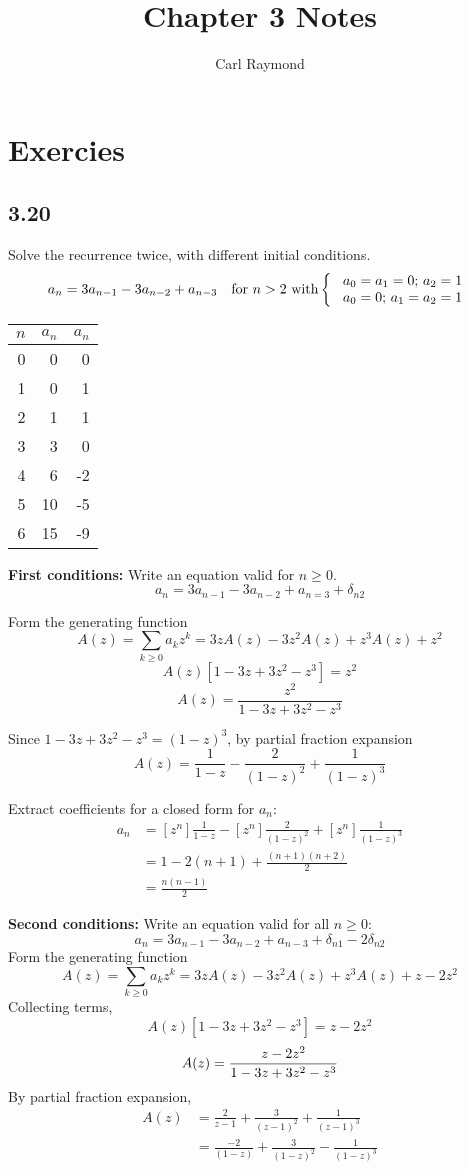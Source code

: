 \documentclass[11pt, oneside]{article}   	%
\title{Chapter 3 Notes}
\author{Carl Raymond}
\begin{document}
\maketitle
\section{Exercies}
\subsection{3.20}

Solve the recurrence twice, with different initial conditions.
\[
	a_n = 3a_{n-1} - 3a_{n-2} + a_{n-3} \quad \text{for $n>2$ with}  \left\{
	\begin{array}{l l}
		\textrm{ $a_0=a_1=0$; $a_2=1$} \\
		\textrm{ $a_0=0$; $a_1 = a_2 = 1$}
	\end{array} \right.
\]

\begin{tabular}{r | r | r}
$n$		& $a_n$	& $a_n$ \\
\hline 
0		& 0		& 0 \\
1		& 0		& 1 \\
2		& 1		& 1 \\
3		& 3		& 0 \\
4		& 6		& -2 \\
5		& 10		& -5 \\
6		& 15		& -9
\end{tabular}

\textbf{First conditions:}
Write an equation valid for $n \ge 0$.
\[
	a_n = 3a_{n-1} - 3a_{n-2} + a_{n=3} + \delta_{n2}
\]

Form the generating function
\[
	A(z) = \sum_{k \ge 0} a_k z^k = 3zA(z) - 3z^2A(z) + z^3A(z) + z^2
\]
\[
	A(z) \left[ 1 -3z + 3z^2 -z^3 \right] = z^2
\]
\[
	A(z) = \frac{z^2}{1-3z+3z^2-z^3}
\]

Since $1-3z+3z^2-z^3 = (1-z)^3$, by partial fraction expansion
\[
	A(z) = \frac{1}{1-z} - \frac{2}{(1-z)^2}  + \frac{1}{(1-z)^3}
\]

Extract coefficients for a closed form for $a_n$:
\begin{align*}
	a_n &= \left[z^n\right] \frac{1}{1-z} - \left[z^n\right] \frac{2}{(1-z)^2} + \left[z^n\right] \frac{1}{(1-z)^3} \\
		&= 1 - 2(n+1) + \frac{(n+1)(n+2)}{2} \\
		&= \frac{n(n-1)}{2}
\end{align*}

\textbf{Second conditions:} Write an equation valid for all $n \ge 0$:
\[
	a_n = 3a_{n-1} - 3a_{n-2} + a_{n-3} + \delta_{n1} - 2\delta_{n2}
\]
Form the generating function
\[
	A(z) = \sum_{k \ge 0} a_k z^k = 3zA(z) - 3z^2A(z) + z^3A(z) + z - 2z^2
\]
Collecting terms,
\[
	A(z) \left[ 1 - 3z + 3z^2 - z^3 \right] = z - 2z^2
\]
\[
	A(z) = \frac{z-2z^2}{1-3z+3z^2-z^3} \\
\]
By partial fraction expansion,
\begin{align*}
	A(z) &= \frac{2}{z-1} + \frac{3}{(z-1)^2} + \frac{1}{(z-1)^3} \\
		&= \frac{-2}{(1-z)} + \frac{3}{(1-z)^2} - \frac{1}{(1-z)^3}
\end{align*}
\end{document}
